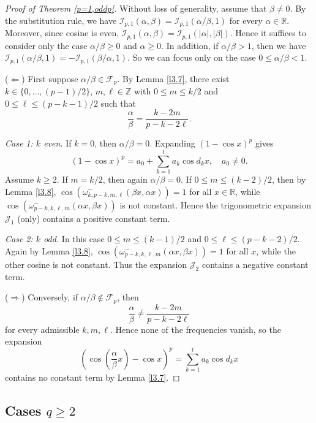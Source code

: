 \documentclass[12pt, reqno]{amsart}
\theoremstyle{plain}
\theoremstyle{definition}
\begin{document}
\begin{proof}[Proof of Theorem \ref{p=1,oddp}]
    Without loss of generality, assume that $\beta\neq 0$. By the substitution rule, we have
    $\mathcal{I}_{p,1}(\alpha,\beta)=\mathcal{I}_{p,1}(\alpha/\beta,1)$
    for every $\alpha\in\mathbb{R}$. Moreover, since cosine is even,
    $\mathcal{I}_{p,1}(\alpha,\beta)=\mathcal{I}_{p,1}(\lvert\alpha\rvert,\lvert\beta\rvert)$. Hence it suffices to consider only the case $\alpha/\beta\geq 0$ and $\alpha\geq 0$. In addition, if $\alpha/\beta>1$, then we have
    $\mathcal{I}_{p,1}(\alpha/\beta,1)=-\mathcal{I}_{p,1}(\beta/\alpha,1)$.
    So we can focus only on the case $0\leq\alpha/\beta<1$.

($\Leftarrow$) First suppose $\alpha/\beta\in\mathcal F_p$. By Lemma \ref{l3.7}, there exist
$
k\in\{0,\ldots,(p-1)/2\}$, $m,\ell\in\mathbb Z$
with $0\le m\le k/2$ and $0\le\ell\le(p-k-1)/2$ such that
\[\frac{\alpha}{\beta}=\frac{k-2m}{p-k-2\ell}.\]

\textit{Case 1: $k$ even.}
If $k=0$, then $\alpha/\beta=0$. Expanding $(1-\cos x)^p$ gives
\[(1-\cos x)^p=a_0+\sum_{k=1}^t a_k\cos d_kx,\quad a_0\ne 0.\]
Assume $k\ge2$. If $m=k/2$, then again $\alpha/\beta=0$.  
If $0\le m\le(k-2)/2$, then by Lemma \ref{l3.8},
$\cos(\omega^-_{k,p-k,m,\ell}(\beta x,\alpha x))=1$
for all $x\in\mathbb R$, while
$\cos(\omega^-_{p-k,k,\ell,m}(\alpha x,\beta x))$
is not constant. Hence the trigonometric expansion $\mathcal{J}_1$ (only) contains a positive constant term.

\textit{Case 2: $k$ odd.}
In this case $0\le m\le(k-1)/2$ and $0\le\ell\le(p-k-2)/2$. Again by Lemma \ref{l3.8},
$\cos(\omega^-_{p-k,k,\ell,m}(\alpha x,\beta x))=1$
for all $x$, while the other cosine is not constant. Thus the expansion $\mathcal{J}_2$ contains a negative constant term.


($\Rightarrow$) Conversely, if $\alpha/\beta\notin\mathcal F_p$, then
\[
\frac{\alpha}{\beta}\neq\frac{k-2m}{p-k-2\ell}
\]
for every admissible $k,m,\ell$. Hence none of the frequencies vanish, so the expansion
\[
\left(\cos\left(\frac{\alpha}{\beta}x\right)-\cos x\right)^p
=
\sum_{k=1}^t a_k\cos d_kx
\]
contains no constant term by Lemma \ref{l3.7}.
\end{proof}



\subsection{Cases $q\ge 2$}
\end{document}
